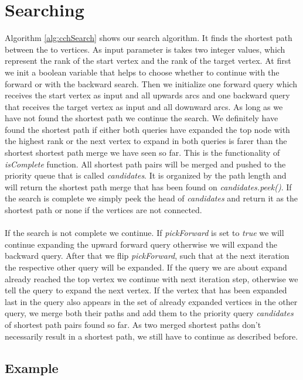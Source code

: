 \section{Searching}



Algorithm \ref{alg:cchSearch} shows our search algorithm. It finds the shortest path between the to vertices. As input parameter is takes two integer values, which represent the rank of the start vertex and the rank of the target vertex.
At first we init a boolean variable that helps to choose whether to continue with the forward or with the backward search. Then we initialize one forward query which receives the start vertex as input and all upwards arcs and one backward query that receives 
the target vertex as input and all downward arcs. As long as we have not found the shortest path we continue the search. We definitely have found the shortest path if either both queries have expanded the top node with the highest rank or 
the next vertex to expand in both queries is farer than the shortest shortest path merge we have seen so far. This is the functionality of \textit{isComplete} function. All shortest path pairs will be merged and pushed to the priority queue that is called \textit{candidates}.
It is organized by the path length and will return the shortest path merge that has been found on \textit{candidates.peek()}.
If the search is complete we simply peek the head of \textit{candidates} and return it as the shortest path or none if the vertices are not connected.
\\\\
If the search is not complete we continue. If \textit{pickForward} is set to \textit{true} we will continue expanding the upward forward query otherwise we will expand the backward query. After that we flip \textit{pickForward}, such that at the next iteration the respective other query will be expanded.
If the query we are about expand already reached the top vertex we continue with next iteration step, otherwise we tell the query to expand the next vertex. If the vertex that has been expanded last in the query also appears in the set of already 
expanded vertices in the other query, we merge both their paths and add them to the priority query \textit{candidates} of shortest path pairs found so far. As two merged shortest paths don't necessarily result in a shortest path, we still have to continue as described before.




\subsection{Example}

